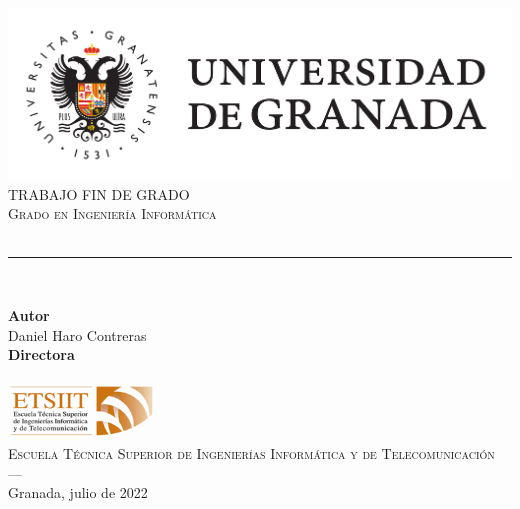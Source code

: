 \begin{titlepage}
 
 
\newlength{\centeroffset}
\setlength{\centeroffset}{-0.5\oddsidemargin}
\addtolength{\centeroffset}{0.5\evensidemargin}
\thispagestyle{empty}

\noindent\hspace*{\centeroffset}\begin{minipage}{\textwidth}

\centering
\includegraphics[width=\textwidth]{imagenes/logo_ugr.pdf}\\[1.4cm]

\textsc{ \Large TRABAJO FIN DE GRADO\\[0.2cm]}
\textsc{ Grado en Ingeniería Informática }\\[1cm]
% 
{\Huge\bfseries \myTitle \\
}
\noindent\rule[-1ex]{\textwidth}{3pt}\\[3.5ex]
\end{minipage}

\vspace{2.5cm}
\noindent\hspace*{\centeroffset}\begin{minipage}{\textwidth}
\centering

\textbf{Autor}\\ {Daniel Haro Contreras}\\[2.5ex]
\textbf{Directora}\\
{\myProf}\\[1cm]
\includegraphics[width=0.3\textwidth]{imagenes/etsiit_logo.png}\\[0.1cm]
\textsc{Escuela Técnica Superior de Ingenierías Informática y de Telecomunicación}\\
\textsc{---}\\
Granada, julio de 2022
\end{minipage}
\end{titlepage}


